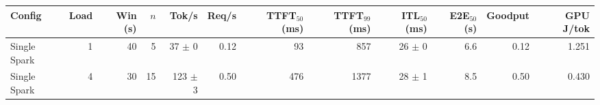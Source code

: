 \begin{tabular}{l r r r r r r r r r r r}
\toprule
Config & Load & Win (s) & $n$ & Tok/s & Req/s & TTFT$_{50}$ (ms) & TTFT$_{99}$ (ms) & ITL$_{50}$ (ms) & E2E$_{50}$ (s) & Goodput & GPU J/tok \\
\midrule
Single Spark & 1 & 40 & 5\rlap{$^\dagger$} & 37 $\pm$ 0 & 0.12 & 93 & 857 & 26 $\pm$ 0 & 6.6 & 0.12 & 1.251 \\
Single Spark & 4 & 30 & 15\rlap{$^\dagger$} & 123 $\pm$ 3 & 0.50 & 476 & 1377 & 28 $\pm$ 1 & 8.5 & 0.50 & 0.430 \\
\bottomrule
\end{tabular}
